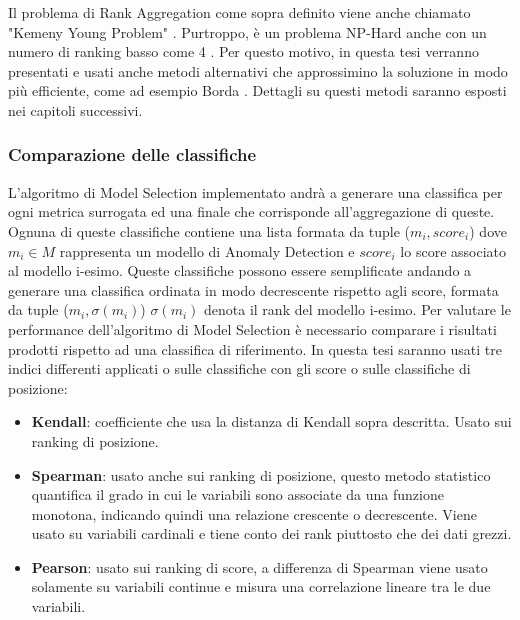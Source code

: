 Il problema di Rank Aggregation come sopra definito viene anche chiamato "Kemeny Young Problem" \cite{pmlr-v54-korba17a}. Purtroppo, è un problema NP-Hard anche con un numero di ranking basso come 4 \cite{inproceedingsrankagg}. Per questo motivo, in questa tesi verranno presentati e usati anche metodi alternativi che approssimino la soluzione in modo più efficiente, come ad esempio Borda \cite{borda}. Dettagli su questi metodi saranno esposti nei capitoli successivi.

\subsubsection{Comparazione delle classifiche}
L'algoritmo di Model Selection implementato andrà a generare una classifica per ogni metrica surrogata ed una finale che corrisponde all'aggregazione di queste. Ognuna di queste classifiche contiene una lista formata da tuple (\(m_i, score_i\)) dove $m_i \in M $ rappresenta un modello di Anomaly Detection e $score_i$ lo score associato al modello i-esimo.
Queste classifiche possono essere semplificate andando a generare una classifica ordinata in modo decrescente rispetto agli score, formata da tuple (\(m_i, \sigma(m_i)\)) $\sigma(m_i)$ denota il rank del modello i-esimo.
Per valutare le performance dell'algoritmo di Model Selection è necessario comparare i risultati prodotti rispetto ad una classifica di riferimento.
In questa tesi saranno usati tre indici differenti applicati o sulle classifiche con gli score o sulle classifiche di posizione:

\begin{itemize}
	\item \textbf{Kendall}: coefficiente che usa la distanza di Kendall sopra descritta. Usato sui ranking di posizione.
	\item \textbf{Spearman}: usato anche sui ranking di posizione, questo metodo statistico quantifica il grado in cui le variabili sono associate da una funzione monotona, indicando quindi una relazione crescente o decrescente. Viene usato su variabili cardinali e tiene conto dei rank piuttosto che dei dati grezzi.
	\item \textbf{Pearson}: usato sui ranking di score, a differenza di Spearman viene usato solamente su variabili continue e misura una correlazione lineare tra le due variabili.
\end{itemize}
